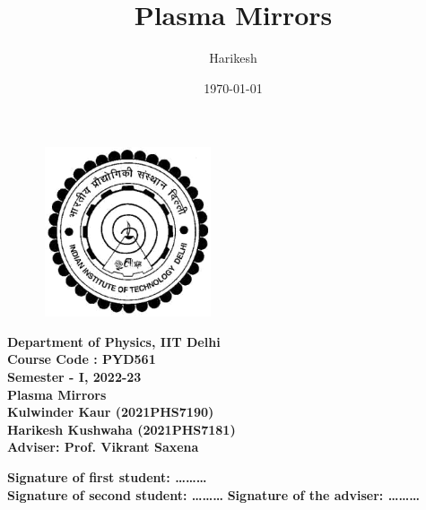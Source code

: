 \documentclass[12pt]{article}
\title{Plasma Mirrors}
\author{Harikesh}
\date{\today}
\newenvironment{changemargin}[2]{
\begin{list}{}{
\setlength{\topsep}{0pt}
\setlength{\leftmargin}{#1}
\setlength{\rightmargin}{#2}
\setlength{\listparindent}{\parindent}
\setlength{\itemindent}{\parindent}
\setlength{\parsep}{\parskip}
}
\item[]}{\end{list}}
\begin{document}
\begin{titlepage}
    \begin{changemargin}{-2cm}{-2cm}
        \begin{figure}
            \includegraphics[width=5cm, height=5cm]{logo.png}
            \centering
        \end{figure}
        \begin{center}
            \textbf{\Large{Department of Physics, IIT Delhi}}\\
            \vspace*{1cm}
            \textbf{\Large{Course Code : PYD561}}\\
            \vspace*{0.2cm}
            \textbf{\Large {Semester - I, 2022-23}}\\
            \vspace*{1cm}
            \textbf{\LARGE{Plasma Mirrors}}\\
            \vspace*{1cm}
            \textbf{\Large{Kulwinder Kaur (2021PHS7190)}}\\
            \vspace*{0.2cm}
            \textbf{\Large {Harikesh Kushwaha (2021PHS7181)}}\\
            \vspace*{1cm}
            \textbf{\Large {Adviser: Prof. Vikrant Saxena}}\\
            \vspace*{2cm}
        \end{center}
        \begin{flushleft}


            \textbf{Signature of first student: \ldots \ldots \ldots}\\
            \vspace*{1cm}
            \textbf{Signature of second student: \ldots \ldots \ldots}
            \hspace*{2cm}
            \textbf{Signature of the adviser: \ldots \ldots \ldots}
        \end{flushleft}
    \end{changemargin}
\end{titlepage}
\end{document}
